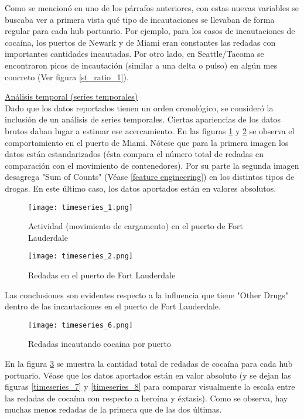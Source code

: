 \documentclass[12pt]{article}
\begin{document}
		Como se mencionó en uno de los párrafos anteriores, con estas nuevas variables se buscaba ver a primera vista qué tipo de incautaciones se llevaban de forma regular para cada hub portuario. Por ejemplo, para los casos de incautaciones de cocaína, los puertos de Newark y de Miami eran constantes las redadas con importantes cantidades incautadas. Por otro lado, en Seattle/Tacoma se encontraron picos de incautación (similar a una delta o pulso) en algún mes concreto (Ver figura \ref{st_ratio_1}).

		\underline{Análisis temporal (series temporales)}\\
		Dado que los datos reportados tienen un orden cronológico, se consideró la inclusión de un análisis de series temporales. Ciertas apariencias de los datos brutos daban lugar a estimar ese acercamiento. En las figuras \ref{timeseries_1} y \ref{timeseries_2} se observa el comportamiento en el puerto de Miami. Nótese que para la primera imagen los datos están estandarizados (ésta compara el número total de redadas en comparación con el movimiento de contenedores). Por su parte la segunda imagen desagrega "Sum of Counts" (Véase \ref{feature engineering}) en los distintos tipos de drogas. En este último caso, los datos aportados están en valores absolutos.
		\begin{figure}[H]
			\caption{\label{timeseries_1} Actividad (movimiento de cargamento) en el puerto de Fort Lauderdale}
			\centering
			\hspace*{1cm}
			\texttt{[image: timeseries\_1.png]}
		\end{figure}
	
		\begin{figure}[H]
			\caption{\label{timeseries_2} Redadas en el puerto de Fort Lauderdale}
			\centering
			\hspace*{1cm}
			\texttt{[image: timeseries\_2.png]}
		\end{figure}
	
		Las conclusiones son evidentes respecto a la influencia que tiene "Other Drugs" dentro de las incautaciones en el puerto de Fort Lauderdale.
	
		\begin{figure}[H]
			\caption{\label{timeseries_6} Redadas incautando cocaína por puerto}
			\centering
			\hspace*{1cm}
			\texttt{[image: timeseries\_6.png]}
		\end{figure}
	
		En la figura \ref{timeseries_6} se muestra la cantidad total de redadas de cocaína para cada hub portuario. Véase que los datos aportados están en valor absoluto (y se dejan las figuras \ref{timeseries_7} y  \ref{timeseries_8} para comparar visualmente la escala entre las redadas de cocaína con respecto a heroína y éxtasis). Como se observa, hay muchas menos redadas de la primera que de las dos últimas.
		
\end{document}
